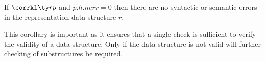 

\begin{corollary}
  If $\corrkl \ty r p$ and $p.h.nerr = 0$ then there are no syntactic
  or semantic errors in the representation data structure $r$.
\end{corollary}

This corollary is important as it ensures that a single check is
sufficient to verify the validity of a data structure. Only if the
data structure is not valid will further checking of substructures be
required.

